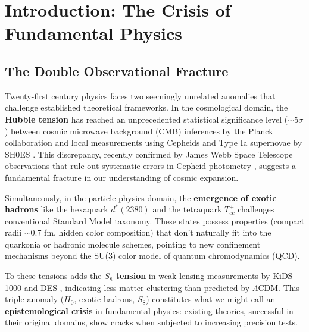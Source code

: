 \documentclass[11pt, a4paper]{article}
\theoremstyle{plain}
\theoremstyle{definition}
\begin{document}

\tableofcontents
\newpage


\section{Introduction: The Crisis of Fundamental Physics}
\label{sec:introduction}

\subsection{The Double Observational Fracture}

Twenty-first century physics faces two seemingly unrelated anomalies that challenge established theoretical frameworks. In the cosmological domain, the \textbf{Hubble tension} has reached an unprecedented statistical significance level ($\sim 5\sigma$) between cosmic microwave background (CMB) inferences by the Planck collaboration \cite{Planck2018} and local measurements using Cepheids and Type Ia supernovae by SH0ES \cite{Riess2022}. This discrepancy, recently confirmed by James Webb Space Telescope observations that rule out systematic errors in Cepheid photometry \cite{Riess2024}, suggests a fundamental fracture in our understanding of cosmic expansion.

Simultaneously, in the particle physics domain, the \textbf{emergence of exotic hadrons} like the hexaquark $d^*(2380)$ \cite{Bashkanov2024} and the tetraquark $T_{cc}^+$ \cite{Harada2025} challenges conventional Standard Model taxonomy. These states possess properties (compact radii $\sim 0.7$ fm, hidden color composition) that don't naturally fit into the quarkonia or hadronic molecule schemes, pointing to new confinement mechanisms beyond the SU(3) color model of quantum chromodynamics (QCD).

To these tensions adds the \textbf{$S_8$ tension} in weak lensing measurements by KiDS-1000 \cite{KiDS2021} and DES \cite{DES2022}, indicating less matter clustering than predicted by $\Lambda$CDM. This triple anomaly ($H_0$, exotic hadrons, $S_8$) constitutes what we might call an \textbf{epistemological crisis} in fundamental physics: existing theories, successful in their original domains, show cracks when subjected to increasing precision tests.
\end{document}
